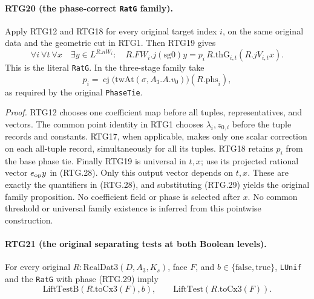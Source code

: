 \paragraph{RTG20 (the phase-correct \texttt{RatG} family).}
\label{claim:RTG20}
Apply RTG12 and RTG18 for every original target index $i$, on the
same original data and the geometric cut in RTG1.  Then RTG19 gives
\[
 \forall i\ \forall t\ \forall x\quad\exists y\in L^{R.nW_i}:
 \quad R.FW_i.j(\mathrm{sg0})y
          =p_i\,R.\mathrm{thG}_{i,t}(R.jV_{i,t}x).
                                                               \tag{RTG.28}
\]
This is the literal \texttt{RatG}.  In the three-stage family take
\[
 p_i=\operatorname{cj}\bigl(\mathrm{twAt}(\sigma,A_3.A.v_0)\bigr)
                         (R.\mathrm{phs}_i),                 \tag{RTG.29}
\]
as required by the original \texttt{PhaseTie}.

\emph{Proof.}
RTG12 chooses one coefficient map before all tuples, representatives,
and vectors.  The common point identity in RTG1 chooses
$\lambda_i,z_{0,i}$ before the tuple records and constants.
RTG17, when applicable, makes only one scalar correction on each
all-tuple record, simultaneously for all its tuples.  RTG18 retains
$p_i$ from the base phase tie.  Finally RTG19 is universal in $t,x$;
use its projected rational vector $e_{\rm op}y$ in (RTG.28).
Only this output vector depends on $t,x$.  These are exactly
the quantifiers in (RTG.28), and substituting (RTG.29) yields the
original family proposition.  No coefficient field or phase is selected
after $x$.  No common threshold or universal family existence is
inferred from this pointwise construction.

\paragraph{RTG21 (the original separating tests at both Boolean levels).}
\label{claim:RTG21}
For every original \(R:\mathrm{RealDat3}(D,A_3,K_s)\), face $F$,
and $b\in\{\mathrm{false},\mathrm{true}\}$,
\texttt{LUnif} and the \texttt{RatG} with phase (RTG.29) imply
\[
 \mathrm{LiftTestB}(R.\mathrm{toCx3}(F),b),
 \qquad \mathrm{LiftTest}(R.\mathrm{toCx3}(F)).                \tag{RTG.30}
\]

